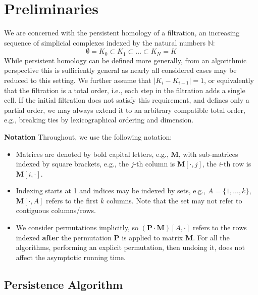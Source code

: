 \documentclass{article}
\newcommand{\matsize}[2]{#1\times #2}
\newcommand{\mat}[1]{\mathbf{#1}}
\begin{document}
\section{Preliminaries}
We are concerned with the persistent homology of a filtration,  an increasing sequence of simplicial complexes indexed by the natural numbers $\mathbb{N}$:
\[ \emptyset  =  K_0 \subset K_1 \subset \ldots \subset K_N =K\]
While persistent homology can be defined more generally, from an algorithmic
perspective this is sufficiently general as nearly all considered cases may be
reduced to this setting. We further assume that $| K_i -  K_{i-1}| = 1$, or
equivalently that the filtration is a total order, i.e., each step in the
filtration adds a single cell. If the initial filtration does not satisfy this
requirement, and defines only a partial order, we may always extend it to an
arbitrary compatible total order, e.g., breaking ties by lexicographical ordering and dimension.


\vspace{0.2cm}
\noindent\textbf{Notation}
Throughout, we use the following notation:
\begin{itemize}
\item Matrices are denoted by bold capital letters, e.g., $\mat{M}$, with sub-matrices indexed by square brackets, e.g., the $j$-th column is $\mat{M}[\cdot,j]$, the $i$-th row is $\mat{M}[i, \cdot]$. 
\item Indexing starts at 1 and indices may be indexed by sets, e.g., $A = \{1,\ldots,k\}$, $\mat{M}[\cdot,A]$ refers to the first $k$ columns. Note that the set may not refer to contiguous columns/rows.
\item We consider permutations implicitly, so $(\mat{P}\cdot\mat{M})[A,\cdot]$ refers to the rows indexed \textbf{after} the permutation $\mat{P}$ is applied to matrix $\mat{M}$. For all the algorithms, performing an explicit permutation, then undoing it, does not affect the asymptotic running time. %
\end{itemize}

\subsection{Persistence Algorithm}
\end{document}
